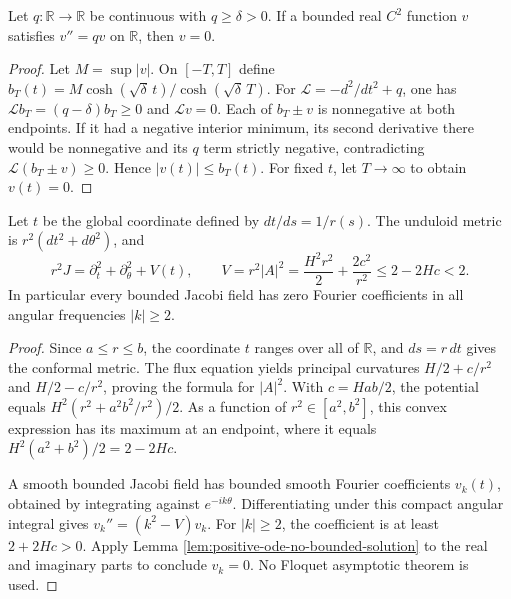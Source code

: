 \begin{lemma}\label{lem:positive-ode-no-bounded-solution}
Let $q:\mathbb R\to\mathbb R$ be continuous with $q\ge\delta>0$. If a bounded real $C^2$ function $v$ satisfies $v''=qv$ on $\mathbb R$, then $v=0$.
\end{lemma}
\begin{proof}
Let $M=\sup|v|$. On $[-T,T]$ define $b_T(t)=M\cosh(\sqrt\delta\,t)/\cosh(\sqrt\delta\,T)$. For $\mathcal L=-d^2/dt^2+q$, one has $\mathcal Lb_T=(q-\delta)b_T\ge0$ and $\mathcal Lv=0$. Each of $b_T\pm v$ is nonnegative at both endpoints. If it had a negative interior minimum, its second derivative there would be nonnegative and its $q$ term strictly negative, contradicting $\mathcal L(b_T\pm v)\ge0$. Hence $|v(t)|\le b_T(t)$. For fixed $t$, let $T\to\infty$ to obtain $v(t)=0$.
\end{proof}

\begin{proposition}\label{prop:unduloid-jacobi-potential}
Let $t$ be the global coordinate defined by $dt/ds=1/r(s)$. The unduloid metric is $r^2(dt^2+d\theta^2)$, and
\[
 r^2J=\partial_t^2+\partial_\theta^2+V(t),\qquad
 V=r^2|A|^2=\frac{H^2r^2}2+\frac{2c^2}{r^2}\le2-2Hc<2.
\]
In particular every bounded Jacobi field has zero Fourier coefficients in all angular frequencies $|k|\ge2$.
\end{proposition}
\begin{proof}
Since $a\le r\le b$, the coordinate $t$ ranges over all of $\mathbb R$, and $ds=r\,dt$ gives the conformal metric. The flux equation yields principal curvatures $H/2+c/r^2$ and $H/2-c/r^2$, proving the formula for $|A|^2$. With $c=Hab/2$, the potential equals $H^2(r^2+a^2b^2/r^2)/2$. As a function of $r^2\in[a^2,b^2]$, this convex expression has its maximum at an endpoint, where it equals $H^2(a^2+b^2)/2=2-2Hc$.

A smooth bounded Jacobi field has bounded smooth Fourier coefficients $v_k(t)$, obtained by integrating against $e^{-ik\theta}$. Differentiating under this compact angular integral gives $v_k''=(k^2-V)v_k$. For $|k|\ge2$, the coefficient is at least $2+2Hc>0$. Apply Lemma \ref{lem:positive-ode-no-bounded-solution} to the real and imaginary parts to conclude $v_k=0$. No Floquet asymptotic theorem is used.
\end{proof}

